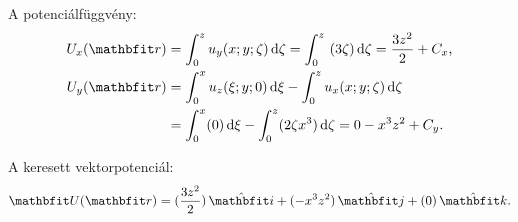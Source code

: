 \documentclass{szb-solution}
\begin{document}
\begin{enumerate}[a)]
\begin{itemize}
                A potenciálfüggvény:
                \begin{align*}
                  U_x(\coordvec)
                   & =
                  \int_0^z u_y(x; y; \zeta) \dd \zeta
                  =
                  \int_0^z  (3 \zeta) \dd \zeta
                  =
                  \frac{3 z^2}{2} + C_x
                  \text,
                  \\
                  U_y(\coordvec)
                   & =
                  \int_0^x u_z(\xi; y; 0) \dd \xi -
                  \int_0^z u_x(x; y; \zeta) \dd \zeta
                  \\
                   & =
                  \int_0^x (0) \dd \xi -
                  \int_0^z (2 \zeta x^3)  \dd \zeta
                  =
                  0 - x^3 z^2 + C_y
                  \text.
                \end{align*}

                A keresett vektorpotenciál:
                $$
                  \rvec U(\coordvec)
                  = \ijk{\frac{3z^2}{2}}{-x^3 z^2}{0}
                  \text.
                $$
        \end{itemize}
\end{enumerate}
\end{document}
